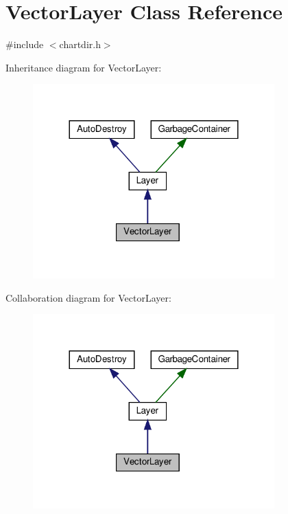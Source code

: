 \hypertarget{class_vector_layer}{}\section{Vector\+Layer Class Reference}
\label{class_vector_layer}


{\ttfamily \#include $<$chartdir.\+h$>$}



Inheritance diagram for Vector\+Layer\+:
\nopagebreak
\begin{figure}[H]
\begin{center}
\leavevmode
\includegraphics[width=264pt]{class_vector_layer__inherit__graph}
\end{center}
\end{figure}


Collaboration diagram for Vector\+Layer\+:
\nopagebreak
\begin{figure}[H]
\begin{center}
\leavevmode
\includegraphics[width=264pt]{class_vector_layer__coll__graph}
\end{center}
\end{figure}

